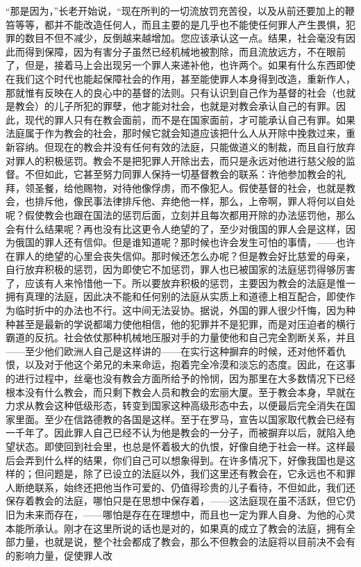 \par “那是因为，”长老开始说，“现在所判的一切流放罚充苦役，以及从前还要加上的鞭笞等等，都并不能改造任何人，而且主要的是几乎也不能使任何罪人产生畏惧，犯罪的数目不但不减少，反倒越来越增加。您应该承认这一点。结果，社会毫没有因此而得到保障，因为有害分子虽然已经机械地被割除，而且流放远方，不在眼前了，但是，接着马上会出现另一个罪人来递补他，也许两个。如果有什么东西即使在我们这个时代也能起保障社会的作用，甚至能使罪人本身得到改造，重新作人，那就惟有反映在人的良心中的基督的法则。只有认识到自己作为基督的社会（也就是教会）的儿子所犯的罪孽，他才能对社会，也就是对教会承认自己的有罪。因此，现代的罪人只有在教会面前，而不是在国家面前，才可能承认自己有罪。如果法庭属于作为教会的社会，那时候它就会知道应该把什么人从开除中挽救过来，重新容纳。但现在的教会并没有任何有效的法庭，只能做道义的制裁，而且自行放弃对罪人的积极惩罚。教会不是把犯罪人开除出去，而只是永远对他进行慈父般的监督。不但如此，它甚至努力同罪人保持一切基督教会的联系：许他参加教会的礼拜，领圣餐，给他赐物，对待他像俘虏，而不像犯人。假使基督的社会，也就是教会，也排斥他，像民事法律排斥他、弃绝他一样，那么，上帝啊，罪人将何以自处呢？假使教会也跟在国法的惩罚后面，立刻并且每次都用开除的办法惩罚他，那么会有什么结果呢？再也没有比这更令人绝望的了，至少对俄国的罪人会是这样，因为俄国的罪人还有信仰。但是谁知道呢？那时候也许会发生可怕的事情，——也许在罪人的绝望的心里会丧失信仰。那时候还怎么办呢？但是教会好比慈爱的母亲，自行放弃积极的惩罚，因为即使它不加惩罚，罪人也已被国家的法庭惩罚得够厉害了，应该有人来怜惜他一下。所以要放弃积极的惩罚，主要因为教会的法庭是惟一拥有真理的法庭，因此决不能和任何别的法庭从实质上和道德上相互配合，即使作为临时折中的办法也不行。这中间无法妥协。据说，外国的罪人很少忏悔，因为种种甚至是最新的学说都竭力使他相信，他的犯罪并不是犯罪，而是对压迫者的横行霸道的反抗。社会依仗那种机械地压服对手的力量使他和自己完全割断关系，并且——至少他们欧洲人自己是这样讲的——在实行这种摒弃的时候，还对他怀着仇恨，以及对于他这个弟兄的未来命运，抱着完全冷漠和淡忘的态度。因此，在这事的进行过程中，丝毫也没有教会方面所给予的怜悯，因为那里在大多数情况下已经根本没有什么教会，而只剩下教会人员和教会的宏丽大厦。至于教会本身，早就在力求从教会这种低级形态，转变到国家这种高级形态中去，以便最后完全消失在国家里面。至少在信路德教的各国是这样。至于在罗马，宣告以国家取代教会已经有一千年了。因此罪人自己已经不认为他是教会的一分子，而被摒弃以后，就陷入绝望状态。即使回到社会里，也总是怀着极大的仇恨，好像自绝于社会一样。这样最后会弄到什么样的结果，你们自己可以想象得到。在许多情况下，好像我国也是这样的；但问题是，除了已设立的法庭以外，我们这里还有教会在，它永远也不和罪人断绝联系，始终还把他当作可爱的、仍值得珍贵的儿子看待，不但如此，我们还保存着教会的法庭，哪怕只是在思想中保存着，——这法庭现在虽不活跃，但它仍旧为未来而存在，——哪怕是存在在理想中，而且也一定为罪人自身、为他的心灵本能所承认。刚才在这里所说的话也是对的，如果真的成立了教会的法庭，拥有全部力量，也就是说，整个社会都成了教会，那么不但教会的法庭将以目前决不会有的影响力量，促使罪人改